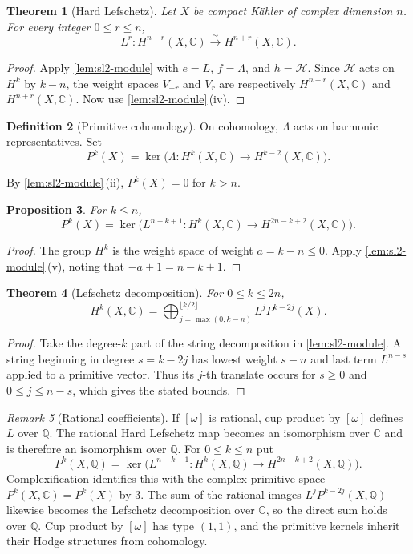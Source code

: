 \documentclass[11pt,reqno]{amsart}
\newtheorem{theorem}{Theorem}[section]
\newtheorem{proposition}[theorem]{Proposition}
\theoremstyle{definition}
\newtheorem{definition}[theorem]{Definition}
\theoremstyle{remark}
\newtheorem{remark}[theorem]{Remark}
\newcommand{\C}{\mathbb{C}}
\newcommand{\Q}{\mathbb{Q}}
\begin{document}
\begin{theorem}[Hard Lefschetz]
\label{thm:hard-lefschetz}
Let $X$ be compact K\"ahler of complex dimension $n$. For every integer
$0\leq r\leq n$,
\[
L^r:H^{n-r}(X,\C)\xrightarrow{\sim}H^{n+r}(X,\C).
\]
\end{theorem}

\begin{proof}
Apply \cref{lem:sl2-module} with
$e=L$, $f=\Lambda$, and $h=\mathcal H$. Since $\mathcal H$ acts on $H^k$ by
$k-n$, the weight spaces $V_{-r}$ and $V_r$ are respectively
$H^{n-r}(X,\C)$ and $H^{n+r}(X,\C)$. Now use
\cref{lem:sl2-module}\,(iv).
\end{proof}

\begin{definition}[Primitive cohomology]
\label{def:primitive}
On cohomology, $\Lambda$ acts on harmonic representatives. Set
\[
P^k(X)=\ker\bigl(\Lambda:H^k(X,\C)\to H^{k-2}(X,\C)\bigr).
\]
\end{definition}

By \cref{lem:sl2-module}\,(ii), $P^k(X)=0$ for $k>n$.

\begin{proposition}
\label{prop:primitive-alt}
For $k\leq n$,
\[
P^k(X)
=\ker\bigl(L^{n-k+1}:H^k(X,\C)\to H^{2n-k+2}(X,\C)\bigr).
\]
\end{proposition}

\begin{proof}
The group $H^k$ is the weight space of weight $a=k-n\leq0$. Apply
\cref{lem:sl2-module}\,(v), noting that $-a+1=n-k+1$.
\end{proof}

\begin{theorem}[Lefschetz decomposition]
\label{thm:lefschetz-decomp}
For $0\leq k\leq2n$,
\[
H^k(X,\C)=\bigoplus_{j=\max(0,k-n)}^{\lfloor k/2\rfloor}
L^jP^{k-2j}(X).
\]
\end{theorem}

\begin{proof}
Take the degree-$k$ part of the string decomposition in
\cref{lem:sl2-module}. A string beginning in degree $s=k-2j$ has
lowest weight $s-n$ and last term $L^{n-s}$ applied to a primitive
vector. Thus its $j$-th translate occurs for $s\geq0$ and
$0\leq j\leq n-s$, which gives the stated bounds.
\end{proof}

\begin{remark}[Rational coefficients]
\label{rem:rational-lefschetz}
If $[\omega]$ is rational, cup product by $[\omega]$ defines $L$ over
$\Q$. The rational Hard Lefschetz map becomes an isomorphism over $\C$
and is therefore an isomorphism over $\Q$. For $0\leq k\leq n$ put
\[
P^k(X,\Q)=\ker\bigl(L^{n-k+1}:H^k(X,\Q)\to H^{2n-k+2}(X,\Q)\bigr).
\]
Complexification identifies this with the complex primitive space
$P^k(X,\C)=P^k(X)$ by \cref{prop:primitive-alt}. The sum of the rational images
$L^jP^{k-2j}(X,\Q)$ likewise becomes the Lefschetz decomposition over
$\C$, so the direct sum holds over $\Q$. Cup product by $[\omega]$ has
type $(1,1)$, and the primitive kernels inherit their Hodge structures
from cohomology.
\end{remark}
\end{document}
